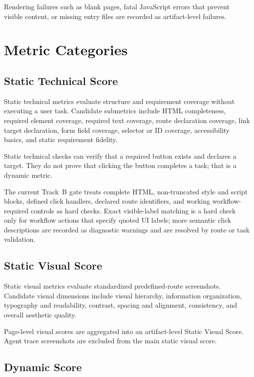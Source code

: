 Rendering failures such as blank pages, fatal JavaScript errors that prevent
visible content, or missing entry files are recorded as artifact-level failures.

\section{Metric Categories}
\label{sec:metric-categories}

\subsection{Static Technical Score}

Static technical metrics evaluate structure and requirement coverage without
executing a user task. Candidate submetrics include HTML completeness, required
element coverage, required text coverage, route declaration coverage, link
target declaration, form field coverage, selector or ID coverage, accessibility
basics, and static requirement fidelity.

Static technical checks can verify that a required button exists and declares a
target. They do not prove that clicking the button completes a task; that is a
dynamic metric.

The current Track~B gate treats complete HTML, non-truncated style and script
blocks, defined click handlers, declared route identifiers, and working
workflow-required controls as hard checks. Exact visible-label matching is a
hard check only for workflow actions that specify quoted UI labels; more
semantic click descriptions are recorded as diagnostic warnings and are resolved
by route or task validation.

\subsection{Static Visual Score}

Static visual metrics evaluate standardized predefined-route screenshots.
Candidate visual dimensions include visual hierarchy, information organization,
typography and readability, contrast, spacing and alignment, consistency, and
overall aesthetic quality.

Page-level visual scores are aggregated into an artifact-level Static Visual
Score. Agent trace screenshots are excluded from the main static visual score.

\subsection{Dynamic Score}

